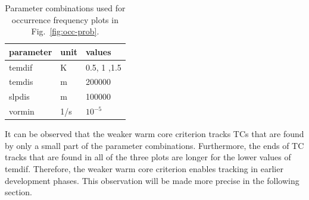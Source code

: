 \begin{table}[ht]
	\centering
	\begin{tabular}{|l|l|l|}
		\hline
		\textbf{parameter} & \textbf{unit} & \textbf{values} \\ \hline
		temdif             & K             & 0.5, 1 ,1.5     \\
		temdis             & m             & 200000          \\
		slpdis             & m             & 100000          \\
		vormin             & 1/s           & $10^{-5}$
		\\
		\hline
	\end{tabular}
	\caption{Parameter combinations used for occurrence frequency plots in Fig.~\ref{fig:occ-prob}.}
	\label{tab:occ-prob-params}
\end{table}
It can be observed that the weaker warm core criterion tracks TCs that are found by only a small part of the parameter combinations. Furthermore, the ends of TC tracks that are found in all of the three plots are longer for the lower values of temdif. Therefore, the weaker warm core criterion enables tracking in earlier development phases. This observation will be made more precise in the following section.
